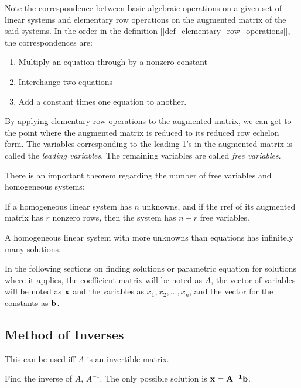 \documentclass{report}
\begin{document}
		Note the correspondence between basic algebraic operations on a given set of linear systems and elementary row operations on the augmented matrix of the said systems. In the order in the definition [\ref{def_elementary_row_operations}], the correspondences are:
		
		\begin{enumerate}
			\item Multiply an equation through by a nonzero constant
			\item Interchange two equations	
			\item Add a constant times one equation to another.
		\end{enumerate}
		
		By applying elementary row operations to the augmented matrix, we can get to the point where the augmented matrix is reduced to its reduced row echelon form. The variables corresponding to the leading 1's in the augmented matrix is called the \emph{leading variables}. The remaining variables are called \emph{free variables}.
		
		There is an important theorem regarding the number of free variables and homogeneous systems:
		
		\begin{thm}
			If a homogeneous linear system has $n$ unknowns, and if the rref of its augmented matrix has $r$ nonzero rows, then the system has $n-r$ free variables.
		\end{thm}
		
		\begin{coro}
			A homogeneous linear system with more unknowns than equations has infinitely many solutions.
		\end{coro}
		
		In the following sections on finding solutions or parametric equation for solutions where it applies, the coefficient matrix will be noted as $A$, the vector of variables will be noted as $\bf{x}$ and the variables as $x_1, x_2, \dots, x_n$, and the vector for the constants as $\bf{b}$.
		
		\subsection{Method of Inverses}
		
		This can be used iff $A$ is an invertible matrix.
		
		Find the inverse of $A$, $A^{-1}$.
		The only possible solution is $\bf{x}=A^{-1}\bf{b}$.
		
\end{document}
